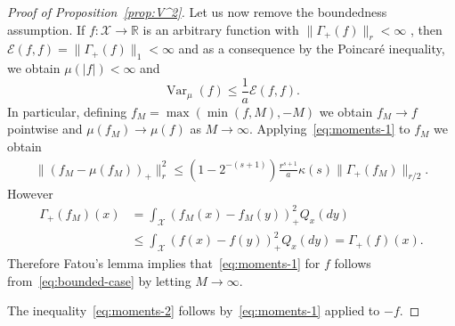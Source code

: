 \documentclass[a4paper]{amsart}
\theoremstyle{definition}
\theoremstyle{remark}
\numberwithin{equation}{section}
\newcommand*{\RR}{\mathbb{R}}
\DeclareMathOperator{\Var}{Var}	%
\begin{document}
\begin{proof}[Proof of Proposition~\ref{prop:V^2}]
Let us now remove the boundedness assumption. If $f \colon \mathcal{X}\to \RR$ is an arbitrary function with $\|\Gamma_+ (f)\|_r < \infty$ , then $\mathcal{E}(f,f) = \|\Gamma_+(f)\|_1 < \infty$ and as a consequence by the Poincar\'e inequality, we obtain $\mu(|f|) < \infty$ and
\begin{displaymath}
  \Var_\mu(f) \le \frac{1}{a} \mathcal{E}(f,f).
\end{displaymath}
In particular, defining $f_M = \max (\min(f,M),-M)$ we obtain $f_M \to f$ pointwise and $\mu( f_M) \to \mu (f)$ as $M\to \infty$. Applying~\eqref{eq:moments-1} to $f_M$ we obtain
\begin{align}\label{eq:bounded-case}
  \|(f_M - \mu(f_M))_+\|_r^2 \le (1-2^{-(s+1)})\frac{r^{s+1}}{a}\kappa(s)\|\Gamma_+(f_M)\|_{r/2}.
\end{align}
However
\begin{align*}
  \Gamma_+(f_M)(x) &= \int_\mathcal{X}(f_M(x) - f_M(y))_+^2Q_x(dy) \\
 &\le \int_\mathcal{X}(f(x) - f(y))_+^2Q_x(dy) = \Gamma_+(f)(x).
\end{align*}
Therefore Fatou's lemma implies that~\eqref{eq:moments-1} for $f$ follows from~\eqref{eq:bounded-case} by letting $M \to \infty$.

\medskip

The  inequality~\eqref{eq:moments-2} follows by~\eqref{eq:moments-1} applied to $-f$.
\end{proof}
\end{document}
